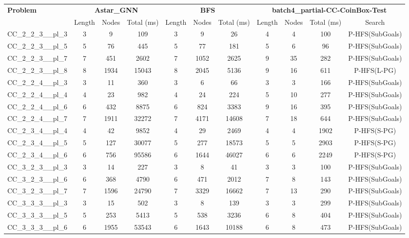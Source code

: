 \begin{table}[!ht]
\centering
\scriptsize
\begin{tabular}{l|ccc|ccc|cccc}
\multirow{2}{*}{\textbf{Problem}} & \multicolumn{3}{c|}{\textbf{Astar\_GNN}} & \multicolumn{3}{c|}{\textbf{BFS}} & \multicolumn{4}{c}{\textbf{batch4\_partial-CC-CoinBox-Test}} \\
\cline{2-11}
& Length & Nodes & Total (ms) & Length & Nodes & Total (ms) & Length & Nodes & Total (ms) & Search \\
\hline
CC\_2\_2\_3\_\_pl\_3 & 3 & 9 & 109 & 3 & 9 & 26 & 4 & 4 & 100 & P-HFS(SubGoals) \\
CC\_2\_2\_3\_\_pl\_5 & 5 & 76 & 445 & 5 & 77 & 181 & 5 & 6 & 96 & P-HFS(SubGoals) \\
CC\_2\_2\_3\_\_pl\_7 & 7 & 451 & 2602 & 7 & 1052 & 2625 & 9 & 35 & 282 & P-HFS(SubGoals) \\
CC\_2\_2\_3\_\_pl\_8 & 8 & 1934 & 15043 & 8 & 2045 & 5136 & 9 & 16 & 611 & P-HFS(L-PG) \\
CC\_2\_2\_4\_\_pl\_3 & 3 & 11 & 360 & 3 & 6 & 66 & 3 & 3 & 166 & P-HFS(SubGoals) \\
CC\_2\_2\_4\_\_pl\_4 & 4 & 23 & 982 & 4 & 24 & 224 & 5 & 10 & 277 & P-HFS(SubGoals) \\
CC\_2\_2\_4\_\_pl\_6 & 6 & 432 & 8875 & 6 & 824 & 3383 & 9 & 16 & 395 & P-HFS(SubGoals) \\
CC\_2\_2\_4\_\_pl\_7 & 7 & 1911 & 32272 & 7 & 4171 & 14608 & 7 & 18 & 644 & P-HFS(SubGoals) \\
CC\_2\_3\_4\_\_pl\_4 & 4 & 42 & 9852 & 4 & 29 & 2469 & 4 & 4 & 1902 & P-HFS(S-PG) \\
CC\_2\_3\_4\_\_pl\_5 & 5 & 127 & 30077 & 5 & 277 & 18573 & 5 & 5 & 2903 & P-HFS(S-PG) \\
CC\_2\_3\_4\_\_pl\_6 & 6 & 756 & 95586 & 6 & 1644 & 46027 & 6 & 6 & 2249 & P-HFS(S-PG) \\
CC\_3\_2\_3\_\_pl\_3 & 3 & 14 & 227 & 3 & 8 & 41 & 3 & 3 & 100 & P-HFS(SubGoals) \\
CC\_3\_2\_3\_\_pl\_6 & 6 & 368 & 4790 & 6 & 471 & 2012 & 7 & 8 & 143 & P-HFS(SubGoals) \\
CC\_3\_2\_3\_\_pl\_7 & 7 & 1596 & 24790 & 7 & 3329 & 16662 & 7 & 13 & 290 & P-HFS(SubGoals) \\
CC\_3\_3\_3\_\_pl\_3 & 3 & 15 & 502 & 3 & 8 & 139 & 3 & 3 & 299 & P-HFS(SubGoals) \\
CC\_3\_3\_3\_\_pl\_5 & 5 & 253 & 5413 & 5 & 538 & 3236 & 6 & 8 & 404 & P-HFS(SubGoals) \\
CC\_3\_3\_3\_\_pl\_6 & 6 & 1955 & 53543 & 6 & 1643 & 10188 & 6 & 8 & 473 & P-HFS(SubGoals) \\

\end{tabular}
\end{table}
